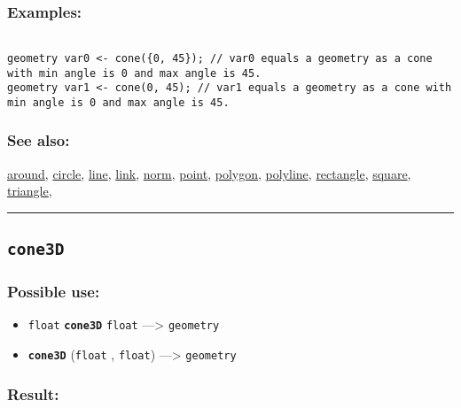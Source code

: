 \documentclass[]{book}
\providecommand{\tightlist}{%
  \setlength{\itemsep}{0pt}\setlength{\parskip}{0pt}}
\theoremstyle{definition}
\theoremstyle{definition}
\theoremstyle{definition}
\theoremstyle{remark}
\begin{document}
\subsubsection{Examples:}\label{examples-72}

\begin{verbatim}
 
geometry var0 <- cone({0, 45}); // var0 equals a geometry as a cone with min angle is 0 and max angle is 45. 
geometry var1 <- cone(0, 45); // var1 equals a geometry as a cone with min angle is 0 and max angle is 45.
\end{verbatim}

\subsubsection{See also:}\label{see-also-58}

\href{OperatorsAA\#around}{around}, \href{OperatorsBC\#circle}{circle},
\href{OperatorsIM\#line}{line}, \href{OperatorsIM\#link}{link},
\href{OperatorsNR\#norm}{norm}, \href{OperatorsNR\#point}{point},
\href{OperatorsNR\#polygon}{polygon},
\href{OperatorsNR\#polyline}{polyline},
\href{OperatorsNR\#rectangle}{rectangle},
\href{OperatorsSZ\#square}{square},
\href{OperatorsSZ\#triangle}{triangle},

\begin{center}\rule{0.5\linewidth}{\linethickness}\end{center}

\subsection{\texorpdfstring{\texttt{cone3D}}{cone3D}}\label{cone3d}

\subsubsection{Possible use:}\label{possible-use-95}

\begin{itemize}
\tightlist
\item
  \texttt{float} \textbf{\texttt{cone3D}} \texttt{float}
  ---\textgreater{} \texttt{geometry}
\item
  \textbf{\texttt{cone3D}} (\texttt{float} , \texttt{float})
  ---\textgreater{} \texttt{geometry}
\end{itemize}

\subsubsection{Result:}\label{result-93}
\end{document}
